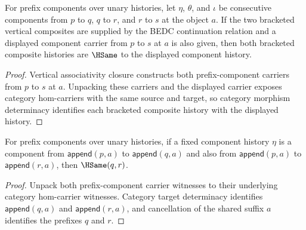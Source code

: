 \begin{theorem}
\label{thm:nattrans-prefix-component-vert-comp-assoc-displayed-deterministic}
For prefix components over unary histories, let $\eta$, $\theta$, and
$\iota$ be consecutive components from $p$ to $q$, $q$ to $r$, and $r$ to
$s$ at the object $a$. If the two bracketed vertical composites are supplied
by the BEDC continuation relation and a displayed component carrier from
$p$ to $s$ at $a$ is also given, then both bracketed composite histories are
$\HSame$ to the displayed component history.
\end{theorem}
\begin{proof}
Vertical associativity closure constructs both prefix-component carriers from
$p$ to $s$ at $a$. Unpacking these carriers and the displayed carrier exposes
category hom-carriers with the same source and target, so category morphism
determinacy identifies each bracketed composite history with the displayed
history.
\end{proof}

\begin{theorem}
\label{thm:nattrans-prefix-component-carrier-target-prefix-deterministic}
For prefix components over unary histories, if a fixed component history
$\eta$ is a component from $\mathsf{append}(p,a)$ to
$\mathsf{append}(q,a)$ and also from $\mathsf{append}(p,a)$ to
$\mathsf{append}(r,a)$, then $\HSame(q,r)$.
\end{theorem}
\begin{proof}
Unpack both prefix-component carrier witnesses to their underlying category
hom-carrier witnesses. Category target determinacy identifies
$\mathsf{append}(q,a)$ and $\mathsf{append}(r,a)$, and cancellation of the
shared suffix $a$ identifies the prefixes $q$ and $r$.
\end{proof}

